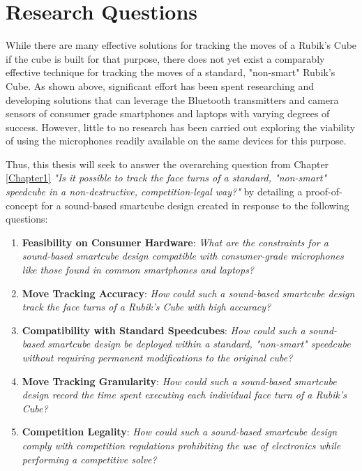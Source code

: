 \section{Research Questions}
\label{sec:research-questions}

While there are many effective solutions for tracking the moves of a
Rubik's Cube if the cube is built for that purpose, there does not yet
exist a comparably effective technique for tracking the moves of a
standard, "non-smart" Rubik's Cube. As shown above, significant effort
has been spent researching and developing solutions that can leverage
the Bluetooth transmitters and camera sensors of consumer grade
smartphones and laptops with varying degrees of success. However,
little to no research has been carried out exploring the viability of
using the microphones readily available on the same devices for this
purpose.

Thus, this thesis will seek to answer the overarching question from
Chapter \ref{Chapter1} \emph{"Is it possible to track the face turns of
a standard, "non-smart" speedcube in a non-destructive,
competition-legal way?"} by detailing a proof-of-concept for a
sound-based smartcube design created in response to the following
questions:

\begin{enumerate}

    \item \textbf{Feasibility on Consumer Hardware}: \emph{What are the
    constraints for a sound-based smartcube design compatible with
    consumer-grade microphones like those found in common smartphones
    and laptops?}
    
    \item \textbf{Move Tracking Accuracy}: \emph{How could such a
    sound-based smartcube design track the face turns of a Rubik's
    Cube with high accuracy?}
    
    \item \textbf{Compatibility with Standard Speedcubes}: \emph{How
    could such a sound-based smartcube design be deployed within a
    standard, "non-smart" speedcube without requiring permanent
    modifications to the original cube?}

    \item \textbf{Move Tracking Granularity}: \emph{How could such a
    sound-based smartcube design record the time spent executing each
    individual face turn of a Rubik's Cube?}
    
    \item \textbf{Competition Legality}: \emph{How could such a
    sound-based smartcube design comply with competition regulations
    prohibiting the use of electronics while performing a competitive
    solve?}
    
\end{enumerate}
